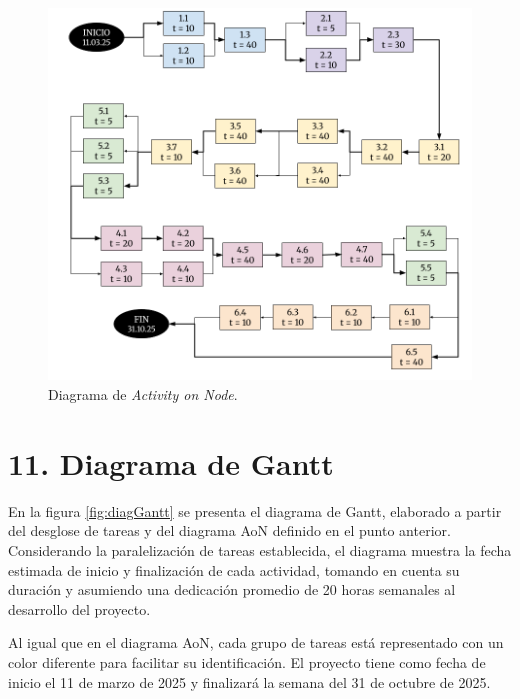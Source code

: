 \documentclass[
11pt, %
]{charter}
\begin{document}
\begin{figure}[htpb]
\centering 
\includegraphics[width=.85\textwidth]{./Figuras/Diagrama-AoN.png}
\caption{Diagrama de \textit{Activity on Node}.}
\label{fig:AoN}
\end{figure}


\section{11. Diagrama de Gantt}
\label{sec:gantt}

En la figura \ref{fig:diagGantt} se presenta el diagrama de Gantt, elaborado a partir del desglose de tareas y del diagrama AoN definido en el punto anterior. Considerando la paralelización de tareas establecida, el diagrama muestra la fecha estimada de inicio y finalización de cada actividad, tomando en cuenta su duración y asumiendo una dedicación promedio de 20 horas semanales al desarrollo del proyecto.

Al igual que en el diagrama AoN, cada grupo de tareas está representado con un color diferente para facilitar su identificación. El proyecto tiene como fecha de inicio el 11 de marzo de 2025 y finalizará la semana del 31 de octubre de 2025.
\end{document}

